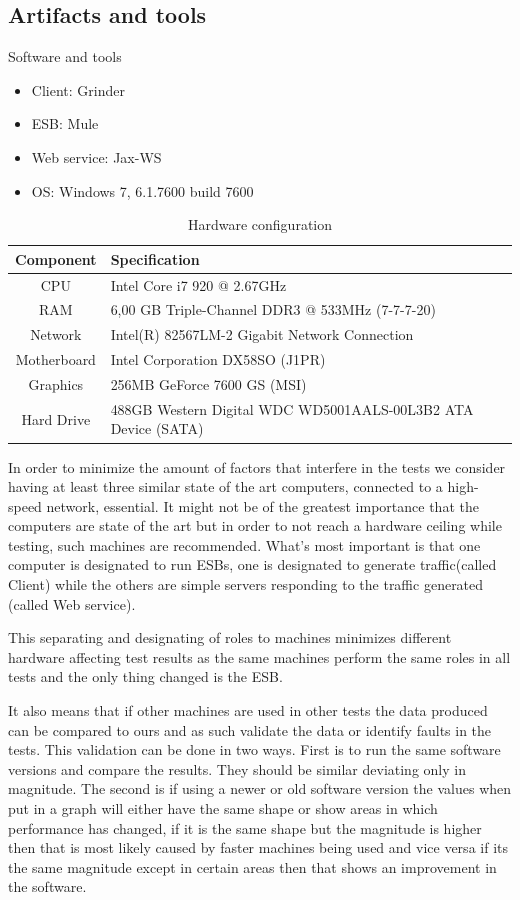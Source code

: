 \subsection{Artifacts and tools}
\begin{table}
	\caption{Software and tools}
	\begin{itemize}
		\item Client: Grinder \cite{whatisgrinder, kod}
		\item ESB: Mule \cite{whatismule, kod}
		\item Web service: Jax-WS \cite{whatisjaxws, kod}
		\item OS: Windows 7, 6.1.7600 build 7600
	\end{itemize}


	\caption{Hardware configuration}
	\begin{tabular}{c l}
		Component & Specification \\ 
		\hline
		CPU & Intel Core i7 920 @ 2.67GHz  \\
		RAM &  6,00 GB Triple-Channel DDR3 @ 533MHz (7-7-7-20) \\
		Network &  Intel(R) 82567LM-2 Gigabit Network Connection \\
		Motherboard &  Intel Corporation DX58SO (J1PR) \\
		Graphics &  256MB GeForce 7600 GS (MSI) \\
		Hard Drive &  488GB Western Digital WDC WD5001AALS-00L3B2 ATA Device (SATA) \\
		\hline
	\end{tabular} 
\end{table}
In order to minimize the amount of factors that interfere in the tests we consider having at least three similar state of the art computers, connected to a high-speed network, essential.
It might not be of the greatest importance that the computers are state of the art but in order to not reach a hardware ceiling while testing, such machines are recommended. 
What's most important is that one computer is designated to run ESBs, one is designated to generate traffic(called Client) while the others are simple servers responding to the traffic generated (called Web service). 

This separating and designating of roles to machines minimizes different hardware affecting test results as the same machines perform the same roles in all tests and the only thing changed is the ESB. 

It also means that if other machines are used in other tests the data produced can be compared to ours and as such validate the data or identify faults in the tests. 
This validation can be done in two ways. 
First is to run the same software versions and compare the results. 
They should be similar deviating only in magnitude. The second is if using a newer or old software version the values when put in a graph will either have the same shape or show areas in which performance has changed, 
if it is the same shape but the magnitude is higher then that is most likely caused by faster machines being used and vice versa if its the same magnitude except in certain areas then that shows an improvement in the software.

